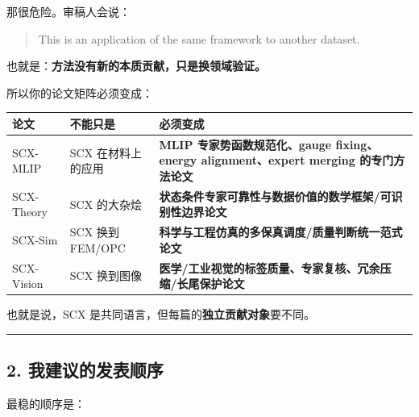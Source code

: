 \documentclass[
  12pt,
]{ctexart}
\begin{document}
那很危险。审稿人会说：

\begin{quote}
This is an application of the same framework to another dataset.
\end{quote}

也就是：\textbf{方法没有新的本质贡献，只是换领域验证。}

所以你的论文矩阵必须变成：

\begin{longtable}[]{@{}
  >{\raggedright\arraybackslash}p{}
  >{\raggedright\arraybackslash}p{}
  >{\raggedright\arraybackslash}p{}@{}}
\toprule\noalign{}
\begin{minipage}[b]{\linewidth}\raggedright
论文
\end{minipage} & \begin{minipage}[b]{\linewidth}\raggedright
不能只是
\end{minipage} & \begin{minipage}[b]{\linewidth}\raggedright
必须变成
\end{minipage} \\
\midrule\noalign{}
\endhead
\bottomrule\noalign{}
\endlastfoot
SCX-MLIP & SCX 在材料上的应用 & \textbf{MLIP 专家势函数规范化、gauge
fixing、energy alignment、expert merging 的专门方法论文} \\
SCX-Theory & SCX 的大杂烩 &
\textbf{状态条件专家可靠性与数据价值的数学框架/可识别性边界论文} \\
SCX-Sim & SCX 换到 FEM/OPC &
\textbf{科学与工程仿真的多保真调度/质量判断统一范式论文} \\
SCX-Vision & SCX 换到图像 &
\textbf{医学/工业视觉的标签质量、专家复核、冗余压缩/长尾保护论文} \\
\end{longtable}

也就是说，SCX 是共同语言，但每篇的\textbf{独立贡献对象}要不同。

\begin{center}\rule{0.5\linewidth}{0.5pt}\end{center}

\subsection{2.
我建议的发表顺序}\label{ux6211ux5efaux8baeux7684ux53d1ux8868ux987aux5e8f}

最稳的顺序是：
\end{document}
